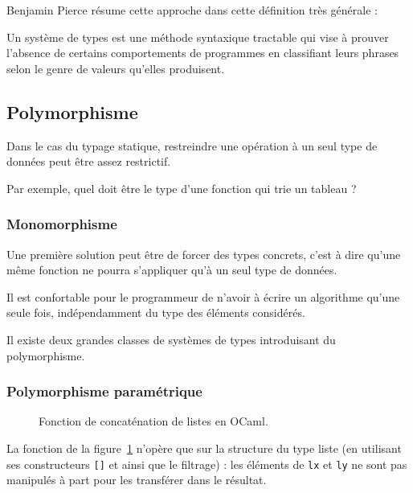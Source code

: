 Benjamin Pierce résume cette approche dans cette définition très générale :

\begin{definition}
Un système de types est une méthode syntaxique tractable qui vise à prouver
l'absence de certains comportements de programmes en classifiant leurs phrases
selon le genre de valeurs qu'elles produisent. \cite{TAPL}
\end{definition}

\subsection{Polymorphisme}

Dans le cas du typage statique, restreindre une opération à un seul type de
données peut être assez restrictif.

Par exemple, quel doit être le type d'une fonction qui trie un tableau ?

\subsubsection{Monomorphisme}

Une première solution peut être de forcer des types concrets, c'est à dire
qu'une même fonction ne pourra s'appliquer qu'à un seul type de données.

Il est confortable pour le programmeur de n'avoir à écrire un algorithme qu'une
seule fois, indépendamment du type des éléments considérés.

Il existe deux grandes classes de systèmes de types introduisant du
polymorphisme.

\subsubsection{Polymorphisme paramétrique}

\cite{Milner78}

\cite{PascalNoEscape}

\begin{figure}
  \caption{Fonction de concaténation de listes en OCaml.}
  \label{fig:listappend}
\end{figure}

La fonction de la figure~\ref{fig:listappend} n'opère que sur la structure du type
liste (en utilisant ses constructeurs \texttt{{[}{]}} et \listcons ainsi que
le filtrage) : les éléments de \texttt{lx} et \texttt{ly} ne sont pas manipulés
à part pour les transférer dans le résultat.

